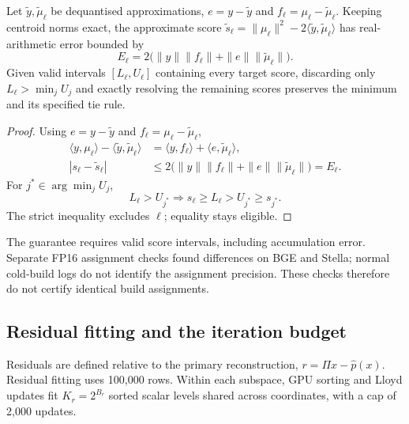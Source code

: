 \begin{resultblock}
\begin{lemma}
\label{lem:4-assignment-bound}
Let $\widetilde y,\widetilde\mu_\ell$ be dequantised approximations,
$e=y-\widetilde y$ and $f_\ell=\mu_\ell-\widetilde\mu_\ell$.
Keeping centroid norms exact, the approximate score
$\widetilde s_\ell=\|\mu_\ell\|^2-2\langle\widetilde y,\widetilde\mu_\ell\rangle$
has real-arithmetic error bounded by
\begin{equation}
 E_\ell=2\bigl(\|y\|\|f_\ell\|+\|e\|\|\widetilde\mu_\ell\|\bigr).
 \label{eq:4-assignment-bound}
\end{equation}
Given valid intervals $[L_\ell,U_\ell]$ containing every target score,
discarding only $L_\ell>\min_j U_j$ and exactly resolving the remaining
scores preserves the minimum and its specified tie rule.
\end{lemma}
\begin{proof}
Using $e=y-\widetilde y$ and $f_\ell=\mu_\ell-\widetilde\mu_\ell$,
\[
 \begin{aligned}
 \langle y,\mu_\ell\rangle-
 \langle\widetilde y,\widetilde\mu_\ell\rangle
 &=\langle y,f_\ell\rangle
   +\langle e,\widetilde\mu_\ell\rangle,\\
 |s_\ell-\widetilde s_\ell|
 &\leq2\bigl(\|y\|\|f_\ell\|
       +\|e\|\|\widetilde\mu_\ell\|\bigr)=E_\ell .
 \end{aligned}
\]
For $j^*\in\arg\min_j U_j$,
\[
 L_\ell>U_{j^*}
 \Longrightarrow
 s_\ell\geq L_\ell>U_{j^*}\geq s_{j^*}.
\]
The strict inequality excludes $\ell$; equality stays eligible.
\end{proof}
\end{resultblock}

The guarantee requires valid score intervals, including accumulation
error. Separate FP16 assignment checks found differences on BGE and
Stella; normal cold-build logs do not identify the assignment precision.
These checks therefore do not certify identical build assignments.

\subsection{Residual fitting and the iteration budget}

Residuals are defined relative to the primary reconstruction,
$r=\Pi x-\widehat p(x)$. Residual fitting uses 100,000 rows. Within each
subspace, GPU sorting and Lloyd updates fit $K_r=2^{B_r}$ sorted scalar
levels shared across coordinates, with a cap of 2,000 updates.

